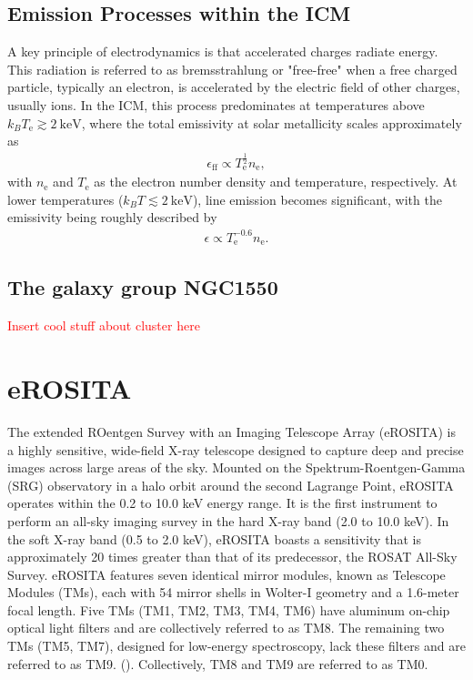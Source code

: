 \subsection{Emission Processes within the ICM} 
A key principle of electrodynamics is that accelerated charges radiate energy. This radiation is referred to as bremsstrahlung or "free-free" when a free charged particle, typically an electron, is accelerated by the electric field of other charges, usually ions. In the ICM, this process predominates at temperatures above \(k_B T_\text{e} \gtrsim \SI{2}{\kilo\electronvolt}\), where the total emissivity at solar metallicity scales approximately as 
\begin{align*}
    \epsilon_{\text{ff}} \propto T_\text{e}^{\frac{1}{2}} n_\text{e},
\end{align*}
with \(n_\text{e}\) and \(T_\text{e}\) as the electron number density and temperature, respectively. At lower temperatures (\(k_B T \lesssim \SI{2}{\kilo\electronvolt}\)), line emission becomes significant, with the emissivity being roughly described by 
\begin{align*}
    \epsilon \propto T_\text{e}^{-0.6} n_\text{e}.
\end{align*}
%
\subsection{The galaxy group NGC1550}
\textcolor{red}{Insert cool stuff about cluster here}
%
\section{eROSITA}
The extended ROentgen Survey with an Imaging Telescope Array (eROSITA) is a highly sensitive, wide-field X-ray telescope designed to capture deep and precise images across large areas of the sky. Mounted on the Spektrum-Roentgen-Gamma (SRG) observatory in a halo orbit around the second Lagrange Point, eROSITA operates within the 0.2 to 10.0 keV energy range. It is the first instrument to perform an all-sky imaging survey in the hard X-ray band (2.0 to 10.0 keV). In the soft X-ray band (0.5 to 2.0 keV), eROSITA boasts a sensitivity that is approximately 20 times greater than that of its predecessor, the ROSAT All-Sky Survey. eROSITA features seven identical mirror modules, known as Telescope Modules (TMs), each with 54 mirror shells in Wolter-I geometry and a 1.6-meter focal length. Five TMs (TM1, TM2, TM3, TM4, TM6) have aluminum on-chip optical light filters and are collectively referred to as TM8. The remaining two TMs (TM5, TM7), designed for low-energy spectroscopy, lack these filters and are referred to as TM9. (\cite{Predehl2021}). Collectively, TM8 and TM9 are referred to as TM0.

